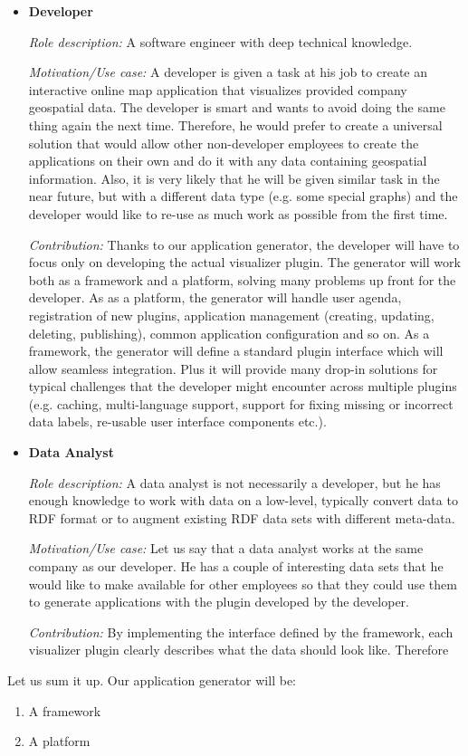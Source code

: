 \begin{itemize}
\item \textbf{Developer}

\textit{Role description:} A software engineer with deep technical knowledge.

\textit{Motivation/Use case:} A developer is given a task at his job to create an interactive online map application that visualizes provided company geospatial data. The developer is smart and wants to avoid doing the same thing again the next time. Therefore, he would prefer to create a universal solution that would allow other non-developer employees to create the applications on their own and do it with any data containing geospatial information. Also, it is very likely that he will be given similar task in the near future, but with a different data type (e.g. some special graphs) and the developer would like to re-use as much work as possible from the first time.

\textit{Contribution:} Thanks to our application generator, the developer will have to focus only on developing the actual visualizer plugin. The generator will work both as a framework and a platform, solving many problems up front for the developer. As as a platform, the generator will handle user agenda, registration of new plugins, application management (creating, updating, deleting, publishing), common application configuration and so on. As a framework, the generator will define a standard plugin interface which will allow seamless integration. Plus it will provide many drop-in solutions for typical challenges that the developer might encounter across multiple plugins (e.g. caching, multi-language support, support for fixing missing or incorrect data labels, re-usable user interface components etc.).

\item \textbf{Data Analyst}

\textit{Role description:} A data analyst is not necessarily a developer, but he has enough knowledge to work with data on a low-level, typically convert data to RDF format or to augment existing RDF data sets with different meta-data. 

\textit{Motivation/Use case:} Let us say that a data analyst works at the same company as our developer. He has a couple of interesting data sets that he would like to make available for other employees so that they could use them to generate applications with the plugin developed by the developer.

\textit{Contribution:} By implementing the interface defined by the framework, each visualizer plugin clearly describes what the data should look like. Therefore 
\end{itemize}


Let us sum it up. Our application generator will be:

\begin{enumerate}
\item A framework
\item A platform
\end{enumerate}
